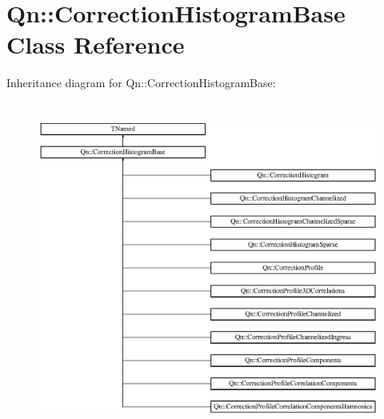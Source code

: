 \hypertarget{classQn_1_1CorrectionHistogramBase}{}\section{Qn\+:\+:Correction\+Histogram\+Base Class Reference}
\label{classQn_1_1CorrectionHistogramBase}
Inheritance diagram for Qn\+:\+:Correction\+Histogram\+Base\+:\begin{figure}[H]
\begin{center}
\leavevmode
\includegraphics[height=10.963856cm]{classQn_1_1CorrectionHistogramBase}
\end{center}
\end{figure}
